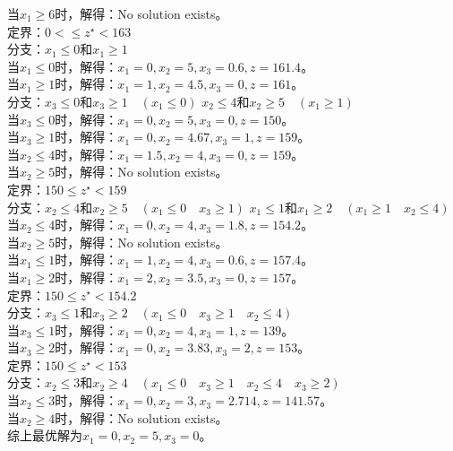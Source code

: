 \documentclass{article}
\begin{document}
当$x_1\geq 6$时，解得：No solution exists。\\
定界：$0< \leq z^{\star} <163$ \\
分支：$x_1 \leq 0$和$x_1 \geq 1$\\
当$x_1\leq 0$时，解得：$x_1=0,x_2=5,x_3=0.6,z=161.4$。\\
当$x_1\geq 1$时，解得：$x_1=1,x_2=4.5,x_3=0,z=161$。\\
分支：$x_3\leq 0$和$x_3\geq 1 \quad (x_1\leq 0)$ \quad $x_2\leq 4$和$x_2\geq 5 \quad (x_1\geq 1)$\\
当$x_3\leq 0$时，解得：$x_1=0,x_2=5,x_3=0,z=150$。\\
当$x_3\geq 1$时，解得：$x_1=0,x_2=4.67,x_3=1,z=159$。\\
当$x_2\leq 4$时，解得：$x_1=1.5,x_2=4,x_3=0,z=159$。\\
当$x_2\geq 5$时，解得：No solution exists。\\
定界：$150 \leq z^{\star} < 159$\\
分支：$x_2\leq 4$和$x_2\geq 5 \quad (x_1\leq 0\quad x_3\geq 1)$ \quad 
$x_1\leq 1$和$x_1\geq 2 \quad (x_1\geq 1\quad x_2\leq 4)$ \\
当$x_2\leq 4$时，解得：$x_1=0,x_2=4,x_3=1.8,z=154.2$。\\
当$x_2\geq 5$时，解得：No solution exists。\\
当$x_1\leq 1$时，解得：$x_1=1,x_2=4,x_3=0.6,z=157.4$。\\
当$x_1\geq 2$时，解得：$x_1=2,x_2=3.5,x_3=0,z=157$。\\
定界：$150\leq z^{\star}< 154.2$\\
分支：$x_3\leq 1$和$x_3\geq 2 \quad (x_1\leq 0\quad x_3\geq 1\quad x_2\leq 4)$\\
当$x_3\leq 1$时，解得：$x_1=0,x_2=4,x_3=1,z=139$。\\
当$x_3\geq 2$时，解得：$x_1=0,x_2=3.83,x_3=2,z=153$。\\
定界：$150\leq z^{\star}<153$\\
分支：$x_2\leq 3$和$x_2\geq 4\quad (x_1\leq 0\quad x_3\geq 1\quad x_2\leq 4\quad x_3\geq 2)$\\
当$x_2\leq 3$时，解得：$x_1=0,x_2=3,x_3=2.714,z=141.57$。\\
当$x_2\geq 4$时，解得：No solution exists。\\
综上最优解为$x_1=0,x_2=5,x_3=0$。
\end{document}
